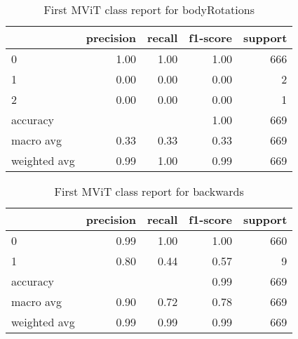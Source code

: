 \begin{table}[h!]
    \begin{tabular}{|l|r|r|r|r|}
                \hline & precision &   recall & f1-score &  support \\ \hline
                0 &      1.00 &      1.00 &     1.00 &      666 \\
                1 &      0.00 &      0.00 &     0.00 &        2 \\
                2 &      0.00 &      0.00 &     0.00 &        1 \\ \hline
         accuracy &           &           &     1.00 &      669 \\
        macro avg &      0.33 &      0.33 &     0.33 &      669 \\
     weighted avg &      0.99 &      1.00 &     0.99 &      669 \\

         \hline
    \end{tabular}
    \caption[Body rotations class report]{First MViT class report for bodyRotations}
    \label{tbl:mvit-first-class-reports-bodyRotations}
\end{table}

\begin{table}[h!]
    \begin{tabular}{|l|r|r|r|r|}
                \hline & precision &   recall & f1-score &  support \\ \hline
                0 &       0.99 &     1.00 &     1.00 &      660 \\
                1 &       0.80 &     0.44 &     0.57 &        9 \\ \hline
         accuracy &            &          &     0.99 &      669 \\
        macro avg &       0.90 &     0.72 &     0.78 &      669 \\
     weighted avg &       0.99 &     0.99 &     0.99 &      669 \\
         \hline
    \end{tabular}
    \caption[Backwards class report]{First MViT class report for backwards}
    \label{tbl:mvit-first-class-reports-backwards}
\end{table}

